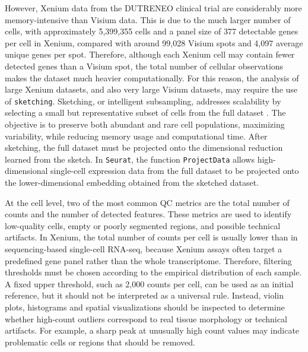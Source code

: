 However, Xenium data from the DUTRENEO clinical trial are considerably more memory-intensive than Visium data. This is due to the much larger number of cells, with approximately 5,399,355 cells and a panel size of 377 detectable genes per cell in Xenium, compared with around 99,028 Visium spots and 4,097 average unique genes per spot. Therefore, although each Xenium cell may contain fewer detected genes than a Visium spot, the total number of cellular observations makes the dataset much heavier computationally. For this reason, the analysis of large Xenium datasets, and also very large Visium datasets, may require the use of \verb|sketching|. Sketching, or intelligent subsampling, addresses scalability by selecting a small but representative subset of cells from the full dataset \cite{Ian.K.Gingerich}. The objective is to preserve both abundant and rare cell populations, maximizing variability, while reducing memory usage and computational time. After sketching, the full dataset must be projected onto the dimensional reduction learned from the sketch. In \texttt{Seurat}, the function \verb|ProjectData| allows high-dimensional single-cell expression data from the full dataset to be projected onto the lower-dimensional embedding obtained from the sketched dataset.

At the cell level, two of the most common QC metrics are the total number of counts and the number of detected features.  These metrics are used to identify low-quality cells, empty or poorly segmented regions, and possible technical artifacts. In Xenium, the total number of counts per cell is usually lower than in sequencing-based single-cell RNA-seq, because Xenium assays often target a predefined gene panel rather than the whole transcriptome. Therefore, filtering thresholds must be chosen according to the empirical distribution of each sample. A fixed upper threshold, such as 2,000 counts per cell, can be used as an initial reference, but it should not be interpreted as a universal rule. Instead, violin plots, histograms and spatial visualizations should be inspected to determine whether high-count outliers correspond to real tissue morphology or technical artifacts. For example, a sharp peak at unusually high count values may indicate problematic cells or regions that should be removed.

